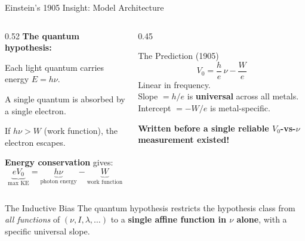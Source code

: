 \documentclass[aspectratio=169,12pt]{beamer}
\begin{document}
\begin{frame}[shrink=5]{Einstein's 1905 Insight: Model Architecture}

\begin{columns}[T]
\begin{column}{0.52\textwidth}
\textbf{The quantum hypothesis:}

\bigskip
Each light quantum carries energy $E = h\nu$.

\smallskip
A single quantum is absorbed by a single electron.

\smallskip
If $h\nu > W$ (work function), the electron escapes.

\bigskip
\textbf{Energy conservation} gives:
\[
  \underbrace{eV_0}_{\text{max KE}}
  = \underbrace{h\nu}_{\text{photon energy}}
  - \underbrace{W}_{\text{work function}}
\]
\end{column}
\begin{column}{0.45\textwidth}
\begin{alertblock}{The Prediction (1905)}
\[
  \boxed{V_0 = \frac{h}{e}\,\nu - \frac{W}{e}}
\]
Linear in frequency.\\[4pt]
Slope $= h/e$ is \textbf{universal} across all metals.\\[4pt]
Intercept $= -W/e$ is metal-specific.
\end{alertblock}

\bigskip
\textbf{Written before a single reliable
$V_0$-vs-$\nu$ measurement existed!}
\end{column}
\end{columns}

\bigskip
\begin{block}{The Inductive Bias}
The quantum hypothesis restricts the hypothesis class from \emph{all
functions} of $(\nu, I, \lambda, \ldots)$ to a \textbf{single affine
function in $\nu$ alone}, with a specific universal slope.
\end{block}

\end{frame}
\end{document}
